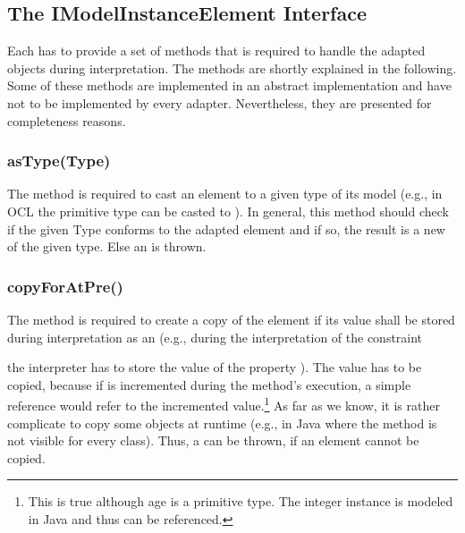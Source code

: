 \subsection{The IModelInstanceElement Interface}

Each  has to provide a set of methods that is
required to handle the adapted objects during interpretation. The methods are
shortly explained in the following. Some of these methods are implemented in an
abstract  implementation and have not to be 
implemented by every adapter. Nevertheless, they are presented for completeness
reasons.

\subsubsection{asType(Type)}

The method  is required to cast an element to a given type of
its model (e.g., in \acs{OCL} the primitive type  can be casted to
). In general, this method should check if the given Type conforms to 
the adapted element and if so, the result is a new  
of the given type. Else an  is thrown.

\subsubsection{copyForAtPre()} 

The method  is required to create a copy of the element if 
its value shall be stored during interpretation as an 
(e.g., during the interpretation of the constraint


the interpreter has to store the value of the property ). The value
has to be copied, because if  is incremented during the method's
execution, a simple reference would refer to the incremented
value.\footnote{This is true although age is a primitive type. The integer
instance is modeled in Java and thus can be referenced.} As far as we know, it 
is rather complicate to copy some objects at runtime (e.g., in Java where the 
 method is not visible for every class). Thus, a 
 can be thrown, if an element cannot be copied.

